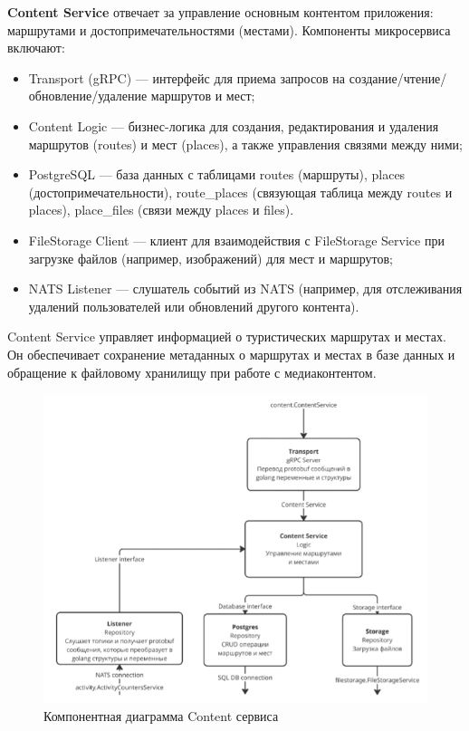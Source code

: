 \textbf{Content Service} отвечает за управление основным контентом приложения: маршрутами и достопримечательностями (местами). Компоненты микросервиса включают:
\begin{itemize}
    \item Transport (gRPC) — интерфейс для приема запросов на создание/чтение/обновление/удаление маршрутов и мест;
    \item Content Logic — бизнес-логика для создания, редактирования и удаления маршрутов (routes) и мест (places), а также управления связями между ними;
    \item PostgreSQL — база данных с таблицами routes (маршруты), places (достопримечательности), route\_places (связующая таблица между routes и places), place\_files (связи между places и files).
    \item FileStorage Client — клиент для взаимодействия с FileStorage Service при загрузке файлов (например, изображений) для мест и маршрутов;
    \item NATS Listener — слушатель событий из NATS (например, для отслеживания удалений пользователей или обновлений другого контента).
\end{itemize}
Content Service управляет информацией о туристических маршрутах и местах. Он обеспечивает сохранение метаданных о маршрутах и местах в базе данных и обращение к файловому хранилищу при работе с медиаконтентом.
\begin{figure}[H]
        \centering
        \includegraphics[width=0.8\linewidth]{Images/second_chapter_backend_architecture/Picture6.png}
        \caption{Компонентная диаграмма Content сервиса}
        \label{fig:content-service-component-diagram}
\end{figure}

